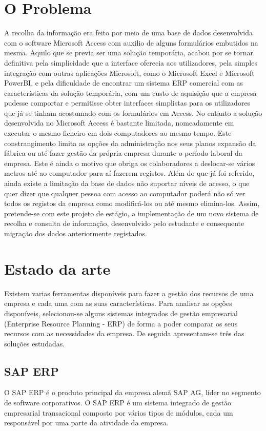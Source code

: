\section{O Problema}
A recolha da informação era feito por meio de uma base de dados desenvolvida com o software Microsoft Access\label{sym:MS_ACCESS} com auxilio de alguns formulários embutidos na mesma. Aquilo que se previa ser uma solução temporária, acabou por se tornar definitiva pela simplicidade que a interface oferecia aos utilizadores, pela simples integração com outras aplicações Microsoft, como o Microsoft Excel\label{sym:MS_EXCEL} e Microsoft PowerBI\label{sym:MS_POWERBI}, e pela dificuldade de encontrar um sistema ERP\label{sym:ERP} comercial com as características da solução temporária, com um custo de aquisição que a empresa pudesse comportar e permitisse obter interfaces simplistas para os utilizadores que já se tinham acostumado com os formulários em Access.
No entanto a solução desenvolvida no Microsoft Access é bastante limitada, nomeadamente em executar o mesmo ficheiro em dois computadores ao mesmo tempo. Este constrangimento limita as opções da administração nos seus planos expansão da fábrica ou até fazer gestão da própria empresa durante o período laboral da empresa. Este é ainda o motivo que obriga os colaboradores a deslocar-se vários metros até ao computador para aí fazerem registos. Além do que já foi referido, ainda existe a limitação da base de dados não suportar níveis de acesso, o que quer dizer que qualquer pessoa com acesso ao computador poderá não só ver todos os registos da empresa como modificá-los ou até mesmo elimina-los. Assim, pretende-se com este projeto de estágio, a implementação de um novo sistema de recolha e consulta de informação, desenvolvido pelo estudante e consequente migração dos dados anteriormente registados.

\section{Estado da arte}
Existem varias ferramentas disponíveis para fazer a gestão dos recursos de uma empresa e cada uma com as suas características. Para analisar as opções disponíveis, selecionou-se alguns sistemas integrados de gestão empresarial (Enterprise Resource Planning - ERP) de forma a poder comparar os seus recursos com as necessidades da empresa. De seguida apresentam-se três das soluções estudadas.

\subsection{SAP ERP}
O SAP ERP é o produto principal da empresa alemã SAP AG, líder no segmento de software corporativos\cite{Wikipediab}. O SAP ERP é um sistema integrado de gestão empresarial transacional composto por vários tipos de módulos, cada um responsável por uma parte da atividade da empresa.



